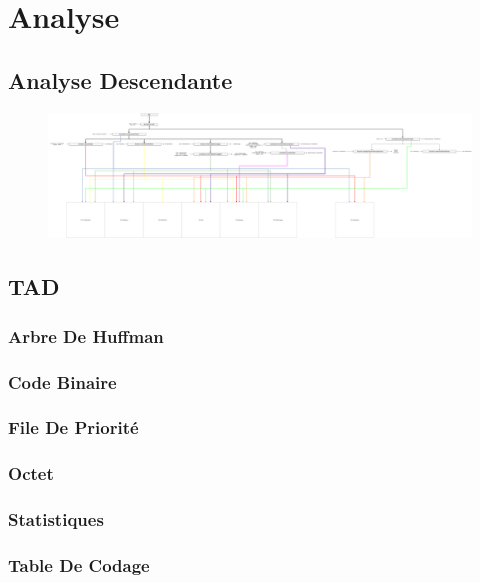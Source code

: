 \documentclass{article}
\begin{document}
\newpage
\section{Analyse}
\subsection{Analyse Descendante}

\begin{figure}
    \includegraphics[scale=0.1]{./Visuels/Analyse_Descendante.png}
\end{figure}

\subsection{TAD}
\subsubsection{Arbre De Huffman}
	
\subsubsection{Code Binaire}
	
\subsubsection{File De Priorité}
	
\subsubsection{Octet}
	
\subsubsection{Statistiques}
	
\subsubsection{Table De Codage}
	
	
\end{document}
